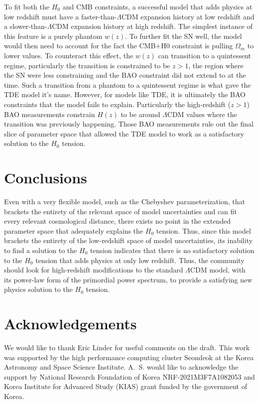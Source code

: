 \documentclass[
 reprint,
 amsmath,amssymb,
 aps,
]{revtex4-2}
\begin{document}
To fit both the $H_0$ and CMB constraints, a successful model that adds physics at low redshift must have a faster-than-$\Lambda$CDM expansion history at low redshift and a slower-than-$\Lambda$CDM expansion history at high redshift.  The simplest instance of this feature is a purely phantom $w(z)$.  To further fit the SN well, the model would then need to account for the fact the CMB+H0 constraint is pulling $\Omega_m$ to lower values.  To counteract this effect, the $w(z)$ can transition to a quintessent regime, particularly the transition is constrained to be $z>1$, the region where the SN were less constraining and the BAO constraint did not extend to at the time.  Such a transition from a phantom to a quintessent regime is what gave the TDE model it's name. However, for models like TDE, it is ultimately the BAO constraints that the model fails to explain. Particularly the high-redshift ($z>1$) BAO measurements constrain $H(z)$ to be around $\Lambda$CDM values where the transition was previously happening. Those BAO measurements rule out the final slice of parameter space that allowed the TDE model to work as a satisfactory solution to the $H_0$ tension.

\section{Conclusions}
Even with a very flexible model, such as the Chebyshev parameterization, that brackets the entirety of the relevant space of model uncertainties and can fit every relevant cosmological distance, there exists no point in the extended parameter space that adequately explains the $H_0$ tension.  Thus, since this model brackets the entirety of the low-redshift space of model uncertainties, its inability to find a solution to the $H_0$ tension indicates that there is no satisfactory solution to the $H_0$ tension that adds physics at only low redshift. Thus, the community should look for high-redshift modifications to the standard $\Lambda$CDM model, with its power-law form of the primordial power spectrum, to provide a satisfying new physics solution to the $H_0$ tension. 

\section*{Acknowledgements}
We would like to thank Eric Linder for useful comments on the draft. This work was supported by the high performance computing cluster Seondeok at the Korea Astronomy and Space Science Institute. A.~S. would like to acknowledge the support by National Research Foundation of Korea NRF-2021M3F7A1082053 and Korea Institute for Advanced Study (KIAS) grant funded by the government of Korea. 




\end{document}
